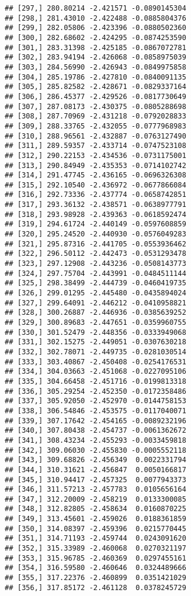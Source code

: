\documentclass[]{book}
\theoremstyle{definition}
\theoremstyle{definition}
\theoremstyle{definition}
\theoremstyle{remark}
\begin{document}
\begin{verbatim}
## [297,] 280.80214 -2.421571 -0.0890145304
## [298,] 281.43010 -2.422488 -0.0885804376
## [299,] 282.05806 -2.423396 -0.0880502360
## [300,] 282.68602 -2.424295 -0.0874253590
## [301,] 283.31398 -2.425185 -0.0867072781
## [302,] 283.94194 -2.426068 -0.0858975039
## [303,] 284.56990 -2.426943 -0.0849975858
## [304,] 285.19786 -2.427810 -0.0840091135
## [305,] 285.82582 -2.428671 -0.0829337164
## [306,] 286.45377 -2.429526 -0.0817730649
## [307,] 287.08173 -2.430375 -0.0805288698
## [308,] 287.70969 -2.431218 -0.0792028833
## [309,] 288.33765 -2.432055 -0.0777968983
## [310,] 288.96561 -2.432887 -0.0763127490
## [311,] 289.59357 -2.433714 -0.0747523108
## [312,] 290.22153 -2.434536 -0.0731175001
## [313,] 290.84949 -2.435353 -0.0714102742
## [314,] 291.47745 -2.436165 -0.0696326308
## [315,] 292.10540 -2.436972 -0.0677866084
## [316,] 292.73336 -2.437774 -0.0658742851
## [317,] 293.36132 -2.438571 -0.0638977791
## [318,] 293.98928 -2.439363 -0.0618592474
## [319,] 294.61724 -2.440149 -0.0597608859
## [320,] 295.24520 -2.440930 -0.0576049283
## [321,] 295.87316 -2.441705 -0.0553936462
## [322,] 296.50112 -2.442473 -0.0531293478
## [323,] 297.12908 -2.443236 -0.0508143773
## [324,] 297.75704 -2.443991 -0.0484511144
## [325,] 298.38499 -2.444739 -0.0460419735
## [326,] 299.01295 -2.445480 -0.0435894024
## [327,] 299.64091 -2.446212 -0.0410958821
## [328,] 300.26887 -2.446936 -0.0385639252
## [329,] 300.89683 -2.447651 -0.0359960755
## [330,] 301.52479 -2.448356 -0.0333949068
## [331,] 302.15275 -2.449051 -0.0307630218
## [332,] 302.78071 -2.449735 -0.0281030514
## [333,] 303.40867 -2.450408 -0.0254176531
## [334,] 304.03663 -2.451068 -0.0227095106
## [335,] 304.66458 -2.451716 -0.0199813318
## [336,] 305.29254 -2.452350 -0.0172358486
## [337,] 305.92050 -2.452970 -0.0144758153
## [338,] 306.54846 -2.453575 -0.0117040071
## [339,] 307.17642 -2.454165 -0.0089232196
## [340,] 307.80438 -2.454737 -0.0061362672
## [341,] 308.43234 -2.455293 -0.0033459818
## [342,] 309.06030 -2.455830 -0.0005552118
## [343,] 309.68826 -2.456349  0.0022331794
## [344,] 310.31621 -2.456847  0.0050166817
## [345,] 310.94417 -2.457325  0.0077943373
## [346,] 311.57213 -2.457783  0.0105656164
## [347,] 312.20009 -2.458219  0.0133300085
## [348,] 312.82805 -2.458634  0.0160870225
## [349,] 313.45601 -2.459026  0.0188361859
## [350,] 314.08397 -2.459396  0.0215770445
## [351,] 314.71193 -2.459744  0.0243091620
## [352,] 315.33989 -2.460068  0.0270321197
## [353,] 315.96785 -2.460369  0.0297455161
## [354,] 316.59580 -2.460646  0.0324489666
## [355,] 317.22376 -2.460899  0.0351421029
## [356,] 317.85172 -2.461128  0.0378245729

\end{verbatim}
\end{document}
